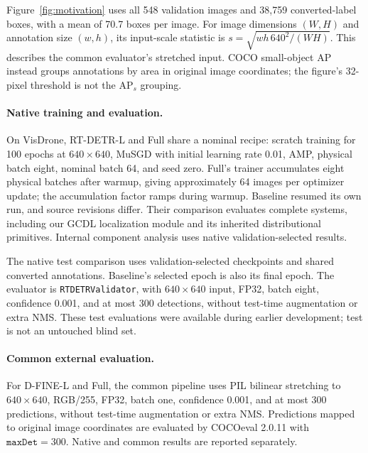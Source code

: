 Figure~\ref{fig:motivation} uses all 548 validation images and 38,759 converted-label boxes, with a mean of 70.7 boxes per image. For image dimensions $(W,H)$ and annotation size $(w,h)$, its input-scale statistic is $s=\sqrt{wh\,640^2/(WH)}$. This describes the common evaluator's stretched input. COCO small-object AP instead groups annotations by area in original image coordinates; the figure's 32-pixel threshold is not the $\mathrm{AP}_s$ grouping.

\paragraph{Native training and evaluation.}
On VisDrone, RT-DETR-L and Full share a nominal recipe: scratch training for 100 epochs at $640\times640$, MuSGD with initial learning rate 0.01, AMP, physical batch eight, nominal batch 64, and seed zero. Full's trainer accumulates eight physical batches after warmup, giving approximately 64 images per optimizer update; the accumulation factor ramps during warmup. Baseline resumed its own run, and source revisions differ. Their comparison evaluates complete systems, including our GCDL localization module and its inherited distributional primitives. Internal component analysis uses native validation-selected results.

The native test comparison uses validation-selected checkpoints and shared converted annotations. Baseline's selected epoch is also its final epoch. The evaluator is \texttt{RTDETRValidator}, with $640\times640$ input, FP32, batch eight, confidence 0.001, and at most 300 detections, without test-time augmentation or extra NMS. These test evaluations were available during earlier development; test is not an untouched blind set.

\paragraph{Common external evaluation.}
For D-FINE-L and Full, the common pipeline uses PIL bilinear stretching to $640\times640$, RGB/255, FP32, batch one, confidence 0.001, and at most 300 predictions, without test-time augmentation or extra NMS. Predictions mapped to original image coordinates are evaluated by COCOeval 2.0.11 with $\texttt{maxDet}=300$. Native and common results are reported separately.

